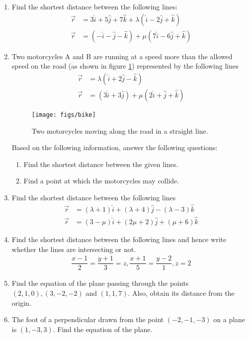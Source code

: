 \begin{enumerate}[label=\thesection.\arabic*.,ref=\thesection.\theenumi]
	\item Find the shortest distance between the following lines:
		\begin{align}
			\vec{r}&=3\hat{i}+5\hat{j}+7\hat{k}+\lambda(\hat{i}-2\hat{j}+\hat{k})\\\vec{r}&=(-\hat{i}-\hat{j}-\hat{k})+\mu(7\hat{i}-6\hat{j}+\hat{k})
		\end{align}

	\item Two motorcycles A and B are running at a speed more than the allowed speed on the road (as shown in figure \ref{fig:bike1}) represented by the following lines 
		\begin{align}
			\vec{r}&=\lambda(\hat{i}+2\hat{j}-\hat{k})\\\vec{r}&=(3\hat{i}+3\hat{j})+\mu(2\hat{i}+\hat{j}+\hat{k})
		\end{align}
		\begin{figure}[H]
			\centering
			\texttt{[image: figs/bike]}
			\caption{Two motorcycles moving along the road in a straight line.}
			\label{fig:bike1}
		\end{figure}
		Based on the following information, answer the following questions:
		\begin{enumerate}
			\item Find the shortest distance between the given lines.
			\item Find a point at which the motorcycles may collide.
		\end{enumerate}
	
	\item Find the shortest distance between the following lines
		\begin{align}
			\vec{r}&=(\lambda+1)\hat{i}+(\lambda+4)\hat{j}-(\lambda-3)\hat{k}\\\vec{r}&=(3-\mu)\hat{i}+(2\mu+2)\hat{j}+(\mu+6)\hat{k}
		\end{align}
	
	\item Find the shortest distance between the following lines and hence write whether the lines are intersecting or not.
		\begin{align}
			\dfrac{x-1}{2}=\dfrac{y+1}{3}=z, \dfrac{x+1}{5}=\dfrac{y-2}{1}, z=2
		\end{align}
\item Find the equation of the plane passing through the points $(2,1,0),(3,-2,-2)$ and $(1,1,7)$. Also, obtain its distance from the origin.

	\item The foot of a perpendicular drawn from the point $(-2,-1,-3)$ on a plane is $(1,-3,3)$. Find the equation of the plane.


\end{enumerate}
